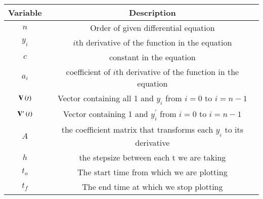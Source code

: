 \begin{tabular}[12pt]{ |c| c|}
    \hline
    \textbf{Variable} & \textbf{Description}\\ 
    \hline
    $n$ & Order of given differential equation\\
    \hline
    $y_i$ & $i$th derivative of the function in the equation\\
    \hline
    $c$ & constant in the equation\\
    \hline
    $a_i$&coefficient of $i$th derivative of the function in the equation\\
    \hline
    $\mathbf{V}\left(t\right)$& Vector containing all 1 and $y_i$ from $i=0$ to $i=n-1$\\
    \hline
    $\mathbf{V}^{\prime}\left(t\right)$ & Vector containing 1 and $y^{\prime}_i$ from $i=0$ to $i=n-1$\\
    \hline
    $A$& the coefficient matrix that transforms each $y_i$ to its derivative\\
    \hline
    $h$&the stepsize between each t we are taking\\
    \hline
    $t_o$& The start time from which we are plotting\\
    \hline
    $t_f$& The end time at which we stop plotting\\
    \hline
    \end{tabular}

